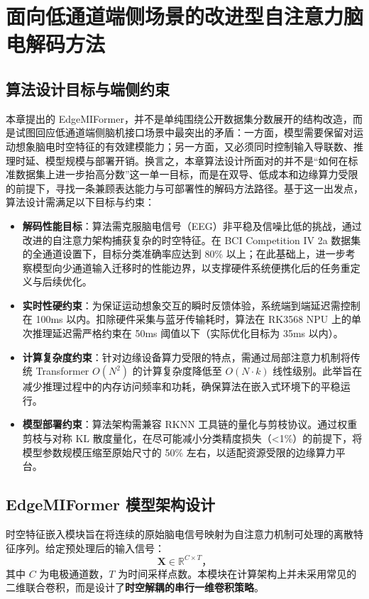 \chapter{面向低通道端侧场景的改进型自注意力脑电解码方法}
\label{cha:algorithm}

\section{算法设计目标与端侧约束}
本章提出的 EdgeMIFormer，并不是单纯围绕公开数据集分数展开的结构改造，而是试图回应低通道端侧脑机接口场景中最突出的矛盾：一方面，模型需要保留对运动想象脑电时空特征的有效建模能力；另一方面，又必须同时控制输入导联数、推理时延、模型规模与部署开销。换言之，本章算法设计所面对的并不是“如何在标准数据集上进一步抬高分数”这一单一目标，而是在双导、低成本和边缘算力受限的前提下，寻找一条兼顾表达能力与可部署性的解码方法路径。基于这一出发点，算法设计需满足以下目标与约束：

\begin{itemize}
    \item \textbf{解码性能目标}：算法需克服脑电信号（EEG）非平稳及信噪比低的挑战，通过改进的自注意力架构捕获复杂的时空特征。在 BCI Competition IV 2a 数据集的全通道设置下，目标分类准确率应达到 80\% 以上；在此基础上，进一步考察模型向少通道输入迁移时的性能边界，以支撑硬件系统便携化后的任务重定义与后续优化。
    \item \textbf{实时性硬约束}：为保证运动想象交互的瞬时反馈体验，系统端到端延迟需控制在 100ms 以内。扣除硬件采集与蓝牙传输耗时，算法在 RK3568 NPU 上的单次推理延迟需严格约束在 50ms 阈值以下（实际优化目标为 35ms 以内）。
    \item \textbf{计算复杂度约束}：针对边缘设备算力受限的特点，需通过局部注意力机制将传统 Transformer $O(N^2)$ 的计算复杂度降低至 $O(N \cdot k)$ 线性级别。此举旨在减少推理过程中的内存访问频率和功耗，确保算法在嵌入式环境下的平稳运行。
    \item \textbf{模型部署约束}：算法架构需兼容 RKNN 工具链的量化与剪枝协议。通过权重剪枝与对称 KL 散度量化，在尽可能减小分类精度损失（<1\%）的前提下，将模型参数规模压缩至原始尺寸的 50\% 左右，以适配资源受限的边缘算力平台。
\end{itemize}

\section{EdgeMIFormer 模型架构设计}
时空特征嵌入模块旨在将连续的原始脑电信号映射为自注意力机制可处理的离散特征序列。给定预处理后的输入信号：
\begin{equation}
    \mathbf{X} \in \mathbb{R}^{C \times T}，
    \label{eq:input_signal}
\end{equation}
其中 $C$ 为电极通道数，$T$ 为时间采样点数。本模块在计算架构上并未采用常见的二维联合卷积，而是设计了\textbf{时空解耦的串行一维卷积策略}。


